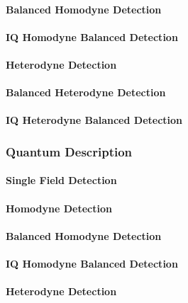 \paragraph{Balanced Homodyne Detection}

\paragraph{IQ Homodyne Balanced Detection}

\paragraph{Heterodyne Detection}

\paragraph{Balanced Heterodyne Detection}

\paragraph{IQ Heterodyne Balanced Detection}

\subsubsection{Quantum Description}

\paragraph{Single Field Detection}

\paragraph{Homodyne Detection}

\paragraph{Balanced Homodyne Detection}

\paragraph{IQ Homodyne Balanced Detection}

\paragraph{Heterodyne Detection}

